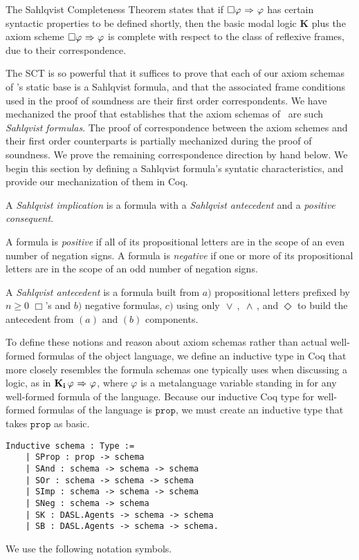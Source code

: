 The Sahlqvist Completeness Theorem states that if $\Box\varphi {\ \Rightarrow \ } \varphi$ has certain syntactic properties to be defined shortly, then the basic modal logic $\mathbf{K}$ plus the axiom scheme $\Box\varphi {\ \Rightarrow \ } \varphi$ is complete with respect to the class of reflexive frames, due to their correspondence.

The SCT is so powerful that it suffices to prove that each of our axiom schemas of \DASL's static base is a Sahlqvist formula, and that the associated frame conditions used in the proof of soundness are their first order correspondents. We have mechanized the proof that establishes that the axiom schemas of \DASL\ are such \emph{Sahlqvist formulas}. The proof of correspondence between the axiom schemes and their first order counterparts is partially mechanized during the proof of soundness. We prove the remaining correspondence direction by hand below. We begin this section by defining a Sahlqvist formula's syntatic characteristics, and provide our mechanization of them in Coq.

A \emph{Sahlqvist implication} is a formula with a \emph{Sahlqvist antecedent} and a \emph{positive consequent}.

A formula is \emph{positive} if all of its propositional letters are in the scope of an even number of negation signs. A formula is \emph{negative} if one or more of its propositional letters are in the scope of an odd number of negation signs.

A \emph{Sahlqvist antecedent} is a formula built from $a)$ propositional letters prefixed by $n\geq0$ $\Box$'s and $b)$ negative formulas, $c)$ using only ${\ \vee \ }$, ${\ \wedge \ }$, and $\Diamond$ to build the antecedent from $(a)$ and $(b)$ components.

To define these notions and reason about axiom schemas rather than actual well-formed formulas of the object language, we define an inductive type in Coq that more closely resembles the formula schemas one typically uses when discussing a logic, as in $\mathbf{K}_{\mathbf{i}}\,\varphi {\ \Rightarrow \ } \varphi$, where $\varphi$ is a metalanguage variable standing in for any well-formed formula of the language. Because our inductive Coq type for well-formed formulas of the language is $\mathtt{prop}$, we must create an inductive type that takes $\mathtt{prop}$ as basic.

\begin{tcolorbox}
	\begin{lstlisting}[language=Coq]
 Inductive schema : Type :=
	| SProp : prop -> schema
	| SAnd : schema -> schema -> schema
	| SOr : schema -> schema -> schema
	| SImp : schema -> schema -> schema
	| SNeg : schema -> schema
	| SK : DASL.Agents -> schema -> schema
	| SB : DASL.Agents -> schema -> schema.
	\end{lstlisting}	
	
\end{tcolorbox}
We use the following notation symbols.

